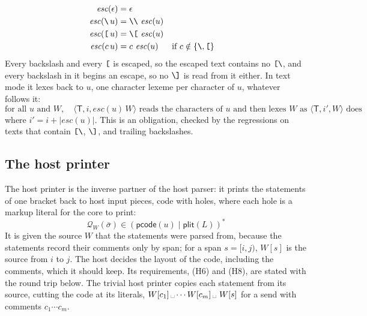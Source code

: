 \documentclass[11pt]{article}
\numberwithin{equation}{section}
\newcommand{\kw}[1]{\ensuremath{\mathsf{#1}}}
\newcommand{\str}[1]{\ensuremath{\text{\texttt{#1}}}}
\newcommand{\bs}{\textbackslash}
\newcommand{\Open}{\str{[\bs}}
\newcommand{\Close}{\str{\bs]}}
\newcommand{\TM}{\kw{T}}
\newcommand{\vs}{\text{\textvisiblespace}}
\begin{document}
\begin{equation}\label{eq:escape}
\begin{aligned}
\mathit{esc}(\epsilon) &= \epsilon \\
\mathit{esc}(\str{\bs}\,u) &= \str{\bs\bs}\ \mathit{esc}(u) \\
\mathit{esc}(\str{[}\,u) &= \str{\bs[}\ \mathit{esc}(u) \\
\mathit{esc}(c\,u) &= c\ \mathit{esc}(u)
  && \text{if } c \notin \{\str{\bs}, \str{[}\}
\end{aligned}
\end{equation}
Every backslash and every $\str{[}$ is escaped, so the escaped text
contains no $\Open$, and every backslash in it begins an escape, so no
$\Close$ is read from it either.  In text mode it lexes back to $u$, one
character lexeme per character of $u$, whatever follows it:
\begin{equation}\label{eq:escape-lexes}
\text{for all } u \text{ and } W,\quad
\langle \TM, i, \mathit{esc}(u)\,W \rangle \text{ reads the characters of }
u \text{ and then lexes } W \text{ as } \langle \TM, i', W \rangle
  \text{ does}
\end{equation}
where $i' = i + |\mathit{esc}(u)|$.  This is an obligation, checked by the
regressions on texts that contain $\Open$, $\Close$, and trailing
backslashes.

\subsection{The host printer}

The host printer is the inverse partner of the host parser: it prints the
statements of one bracket back to host input pieces, code with holes, where
each hole is a markup literal for the core to print:
\begin{equation}\label{eq:host-printer}
\mathcal{Q}_W(\bar\sigma) \in (\kw{pcode}(u) \mid \kw{plit}(L))^*
\end{equation}
It is given the source $W$ that the statements were parsed from, because
the statements record their comments only by span; for a span
$s = [i, j)$, $W[s]$ is the source from $i$ to $j$.  The host decides the
layout of the code, including the comments, which it should keep.  Its
requirements, (H6) and (H8), are stated with the round trip below.  The
trivial host printer copies each statement from its source, cutting the
code at its literals, $W[c_1]\,\vs \cdots W[c_m]\,\vs\ W[s]$ for a send
with comments $c_1 \cdots c_m$.
\end{document}
